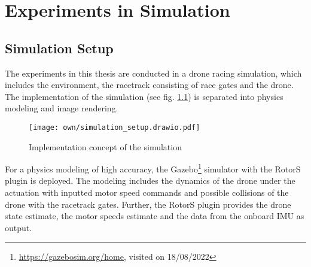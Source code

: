 \chapter{Experiments in Simulation}
\label{maintwo}

\section{Simulation Setup} \label{sec:sim_setup}
The experiments in this thesis 
are conducted in a drone racing simulation,
which includes the environment, 
the racetrack consisting of race gates 
and the drone.
The implementation of the simulation (see fig. \ref{fig:simulation_setup})
is separated into physics modeling and image rendering.
\begin{figure}%
    \centering
    \texttt{[image: own/simulation\_setup.drawio.pdf]}
    \caption[
        Implementation concept of the simulation
    ]{
        Implementation concept of the simulation
    \label{fig:simulation_setup}
    }
\end{figure}

For a physics modeling of high accuracy,
the Gazebo\footnote{\url{https://gazebosim.org/home}, visited on 18/08/2022} 
simulator
with the RotorS \cite{Furrer2016} plugin is deployed.
The modeling includes the dynamics of the drone under 
the actuation with inputted motor speed commands
and possible collisions of the drone with the racetrack gates.
Further, the RotorS plugin provides the
drone state estimate, the motor speeds estimate and the
data from the onboard IMU as output.


